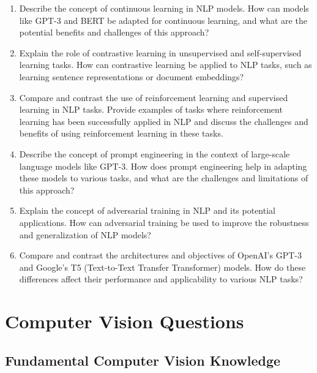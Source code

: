 \documentclass[12pt]{article}
\begin{document}
\begin{enumerate}
  \item Describe the concept of continuous learning in NLP models. How can models like GPT-3 and BERT be adapted for continuous learning, and what are the potential benefits and challenges of this approach?
  \item Explain the role of contrastive learning in unsupervised and self-supervised learning tasks. How can contrastive learning be applied to NLP tasks, such as learning sentence representations or document embeddings?
  \item Compare and contrast the use of reinforcement learning and supervised learning in NLP tasks. Provide examples of tasks where reinforcement learning has been successfully applied in NLP and discuss the challenges and benefits of using reinforcement learning in these tasks.
  \item Describe the concept of prompt engineering in the context of large-scale language models like GPT-3. How does prompt engineering help in adapting these models to various tasks, and what are the challenges and limitations of this approach?
  \item Explain the concept of adversarial training in NLP and its potential applications. How can adversarial training be used to improve the robustness and generalization of NLP models?
  \item Compare and contrast the architectures and objectives of OpenAI's GPT-3 and Google's T5 (Text-to-Text Transfer Transformer) models. How do these differences affect their performance and applicability to various NLP tasks?
\end{enumerate}

\section{Computer Vision Questions}

\subsection{Fundamental Computer Vision Knowledge}
\end{document}
